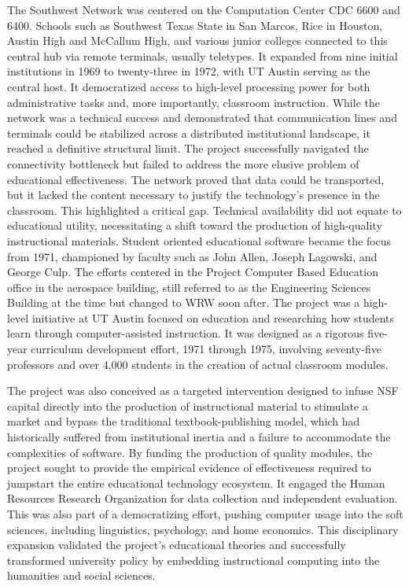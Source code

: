 The Southwest Network was centered on the Computation Center CDC 6600 and 6400. Schools such as Southwest Texas State in San Marcos, Rice in Houston, Austin High and McCallum High, and various junior colleges connected to this central hub via remote terminals, usually teletypes. It expanded from nine initial institutions in 1969 to twenty-three in 1972, with UT Austin serving as the central host. It democratized access to high-level processing power for both administrative tasks and, more importantly, classroom instruction. While the network was a technical success and demonstrated that communication lines and terminals could be stabilized across a distributed institutional landscape, it reached a definitive structural limit. The project successfully navigated the connectivity bottleneck but failed to address the more elusive problem of educational effectiveness. The network proved that data could be transported, but it lacked the content necessary to justify the technology’s presence in the classroom. This highlighted a critical gap. Technical availability did not equate to educational utility, necessitating a shift toward the production of high-quality instructional materials.
Student oriented educational software became the focus from 1971, championed by faculty such as John Allen, Joseph Lagowski, and George Culp. The efforts centered in the Project Computer Based Education office in the aerospace building, still referred to as the Engineering Sciences Building at the time but changed to WRW soon after. The project was a high-level initiative at UT Austin focused on education and researching how students learn through computer-assisted instruction. It was designed as a rigorous five-year curriculum development effort, 1971 through 1975, involving seventy-five professors and over 4,000 students in the creation of actual classroom modules. 

The project was also conceived as a targeted intervention designed to infuse NSF capital directly into the production of instructional material to stimulate a market and bypass the traditional textbook-publishing model, which had historically suffered from institutional inertia and a failure to accommodate the complexities of software. By funding the production of quality modules, the project sought to provide the empirical evidence of effectiveness required to jumpstart the entire educational technology ecosystem. It engaged the Human Resources Research Organization for data collection and independent evaluation. This was also part of a democratizing effort, pushing computer usage into the soft sciences, including linguistics, psychology, and home economics. This disciplinary expansion validated the project’s educational theories and successfully transformed university policy by embedding instructional computing into the humanities and social sciences.
 
